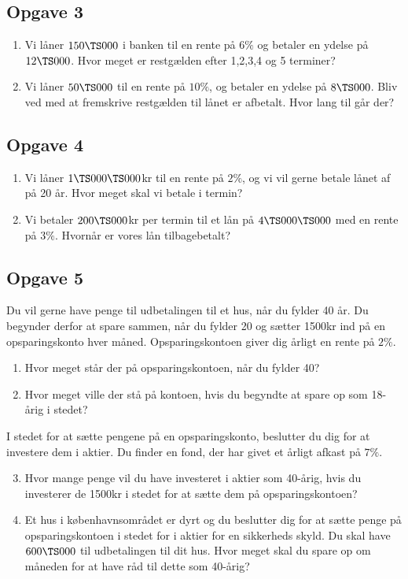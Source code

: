 \subsection*{Opgave 3}
\begin{enumerate}[label=\roman*)]
\item Vi låner $150 \TS 000$ i banken til en rente på $6\%$ og betaler en ydelse på $12 \TS 000$. Hvor meget er restgælden efter 1,2,3,4 og 5 terminer?
\item Vi låner $50 \TS 000$ til en rente på $10\%$, og betaler en ydelse på $8\TS 000$. Bliv ved med at fremskrive restgælden til lånet er afbetalt. Hvor lang til går der?
\end{enumerate}

\subsection*{Opgave 4}
\begin{enumerate}[label=\roman*)]
\item Vi låner $1\TS 000 \TS 000 $kr til en rente på $2\%$, og vi vil gerne betale lånet af på 20 år. Hvor meget skal vi betale i termin?
\item Vi betaler $200 \TS 000$kr per termin til et lån på $4\TS 000 \TS 000$ med en rente på $3\%$. Hvornår er vores lån tilbagebetalt?
\end{enumerate}

\subsection*{Opgave 5}
Du vil gerne have penge til udbetalingen til et hus, når du fylder 40 år. Du begynder derfor at spare sammen, når du fylder 20 og sætter 1500kr ind på en opsparingskonto hver måned. Opsparingskontoen giver dig årligt en rente på $2\%$.
\begin{enumerate}[label=\roman*)]
	\item Hvor meget står der på opsparingskontoen, når du fylder 40?
	\item Hvor meget ville der stå på kontoen, hvis du begyndte at spare op som 18-årig i stedet?
\end{enumerate}
I stedet for at sætte pengene på en opsparingskonto, beslutter du dig for at investere dem i aktier. Du finder en fond, der har givet et årligt afkast på $7\%$. 
\begin{enumerate}[label=\roman*)]
	\setcounter{enumi}{2}
	\item Hvor mange penge vil du have investeret i aktier som 40-årig, hvis du investerer de 1500kr 
	i stedet for at sætte dem på opsparingskontoen?
	\item Et hus i københavnsområdet er dyrt og du beslutter dig for at sætte penge på opsparingskontoen i stedet for i aktier for en sikkerheds skyld. Du skal have $600\TS 000$ til udbetalingen til dit hus. Hvor meget skal du spare op om måneden for at have råd til dette som 40-årig?
\end{enumerate}

